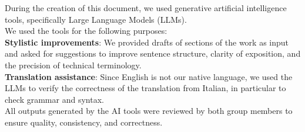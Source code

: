 \noindent
During the creation of this document, we used generative artificial intelligence tools, specifically Large Language Models (LLMs). \\
We used the tools for the following purposes: \\
\textbf{Stylistic improvements}: We provided drafts of sections of the work as input and asked for suggestions to improve sentence structure, clarity of exposition, and the precision of technical terminology. \\
\textbf{Translation assistance}: Since English is not our native language, we used the LLMs to verify the correctness of the translation from Italian, in particular to check grammar and syntax. \\
All outputs generated by the AI tools were reviewed by both group members to ensure quality, consistency, and correctness.